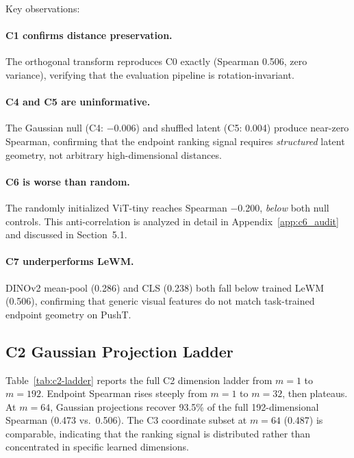 Key observations:

\paragraph{C1 confirms distance preservation.}
The orthogonal transform reproduces C0 exactly (Spearman 0.506, zero
variance), verifying that the evaluation pipeline is rotation-invariant.

\paragraph{C4 and C5 are uninformative.}
The Gaussian null (C4: $-$0.006) and shuffled latent (C5: 0.004) produce
near-zero Spearman, confirming that the endpoint ranking signal requires
\emph{structured} latent geometry, not arbitrary high-dimensional distances.

\paragraph{C6 is worse than random.}
The randomly initialized ViT-tiny reaches Spearman $-$0.200, \emph{below} both null
controls.  This anti-correlation is analyzed in detail in
Appendix~\ref{app:c6_audit} and discussed in Section~5.1.

\paragraph{C7 underperforms LeWM.}
DINOv2 mean-pool (0.286) and CLS (0.238) both fall below trained LeWM
(0.506), confirming that generic visual features do not match task-trained
endpoint geometry on PushT.

\subsection{C2 Gaussian Projection Ladder}
\label{app:c2_ladder}

Table~\ref{tab:c2-ladder} reports the full C2 dimension ladder from $m=1$
to $m=192$.  Endpoint Spearman rises steeply from $m=1$ to $m=32$, then
plateaus.  At $m=64$, Gaussian projections recover 93.5\% of the full
192-dimensional Spearman (0.473 vs.\ 0.506).  The C3 coordinate subset at
$m=64$ (0.487) is comparable, indicating that the ranking signal is
distributed rather than concentrated in specific learned dimensions.

